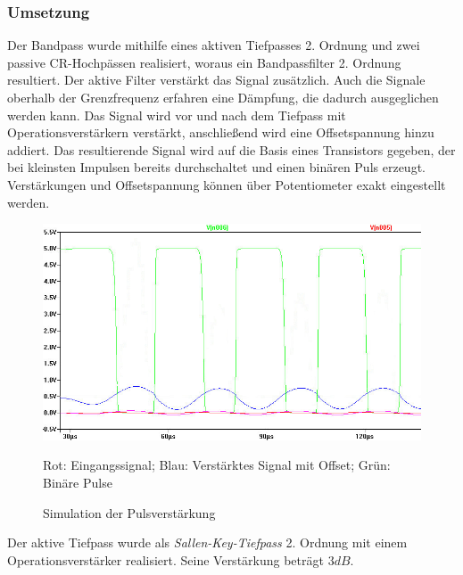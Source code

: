 \subsubsection{Umsetzung}
Der Bandpass wurde mithilfe eines aktiven Tiefpasses 2. Ordnung und zwei passive CR-Hochpässen realisiert, woraus ein Bandpassfilter 2. Ordnung resultiert. Der aktive Filter verstärkt das Signal zusätzlich. Auch die Signale oberhalb der Grenzfrequenz erfahren eine Dämpfung, die dadurch ausgeglichen werden kann. Das Signal wird vor und nach dem Tiefpass mit Operationsverstärkern verstärkt, anschließend wird eine Offsetspannung hinzu addiert. Das resultierende Signal wird auf die Basis eines Transistors gegeben, der bei kleinsten Impulsen bereits durchschaltet und einen binären Puls erzeugt. Verstärkungen und Offsetspannung können über Potentiometer exakt eingestellt werden.
\begin{figure}[H]
\centering
\includegraphics[width=(\textwidth), angle=0]{sim/verstaerker_offset.jpg}
\caption{Simulation der Pulsverstärkung} \label{img:Sim1}
Rot: Eingangssignal; Blau: Verstärktes Signal mit Offset; Grün: Binäre Pulse
\end{figure}
Der aktive Tiefpass wurde als \textit{Sallen-Key-Tiefpass} 2. Ordnung mit einem Operationsverstärker realisiert. Seine Verstärkung beträgt $3dB$. \cite{opamp}

